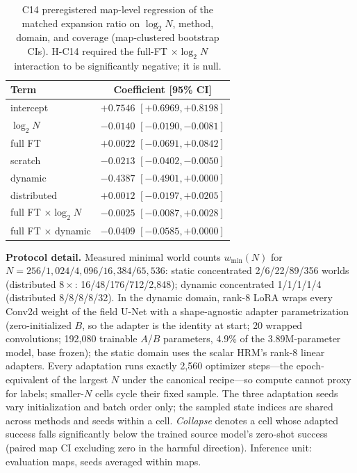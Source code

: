 \documentclass[letterpaper]{article} %
\newcommand{\stage}[1]{\textsc{#1}}
\begin{document}
\begin{table}[t]
\centering
\small
\setlength{\tabcolsep}{3pt}
\begin{tabular}{@{}lc@{}}
\toprule
Term & Coefficient [95\% CI] \\
\midrule
intercept & $+0.7546$ $[+0.6969, +0.8198]$ \\
$\log_2 N$ & $-0.0140$ $[-0.0190, -0.0081]$ \\
full FT & $+0.0022$ $[-0.0691, +0.0842]$ \\
scratch & $-0.0213$ $[-0.0402, -0.0050]$ \\
dynamic & $-0.4387$ $[-0.4901, +0.0000]$ \\
distributed & $+0.0012$ $[-0.0197, +0.0205]$ \\
full FT $\times \log_2 N$ & $-0.0025$ $[-0.0087, +0.0028]$ \\
full FT $\times$ dynamic & $-0.0409$ $[-0.0585, +0.0000]$ \\
\bottomrule
\end{tabular}
\caption{\stage{C14} preregistered map-level regression of the matched expansion ratio on $\log_2 N$, method, domain, and coverage (map-clustered bootstrap CIs). H-C14 required the full-FT $\times \log_2 N$ interaction to be significantly negative; it is null.}
\label{tab:c14reg}
\end{table}

\textbf{Protocol detail.} Measured minimal world counts $w_{\min}(N)$ for $N{=}256/1{,}024/4{,}096/16{,}384/65{,}536$: static concentrated 2/6/22/89/356 worlds (distributed $8\times$: 16/48/176/712/2{,}848); dynamic concentrated 1/1/1/1/4 (distributed 8/8/8/8/32). In the dynamic domain, rank-8 LoRA wraps every Conv2d weight of the field U-Net with a shape-agnostic adapter parametrization (zero-initialized $B$, so the adapter is the identity at start; 20 wrapped convolutions; 192{,}080 trainable $A$/$B$ parameters, 4.9\% of the 3.89M-parameter model, base frozen); the static domain uses the scalar HRM's rank-8 linear adapters. Every adaptation runs exactly 2{,}560 optimizer steps---the epoch-equivalent of the largest $N$ under the canonical recipe---so compute cannot proxy for labels; smaller-$N$ cells cycle their fixed sample. The three adaptation seeds vary initialization and batch order only; the sampled state indices are shared across methods and seeds within a cell. \emph{Collapse} denotes a cell whose adapted success falls significantly below the trained source model's zero-shot success (paired map CI excluding zero in the harmful direction). Inference unit: evaluation maps, seeds averaged within maps.
\end{document}
